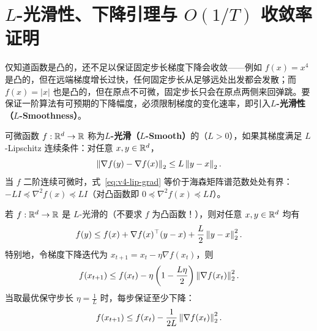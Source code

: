 \section{$L$-光滑性、下降引理与 $O(1/T)$ 收敛率证明}

仅知道函数是凸的，还不足以保证固定步长梯度下降会收敛——例如 $f(x) = x^4$ 是凸的，但在远端梯度增长过快，任何固定步长从足够远处出发都会发散；而 $f(x) = |x|$ 也是凸的，但在原点不可微，固定步长只会在原点两侧来回弹跳。要保证一阶算法有可预期的下降幅度，必须限制梯度的变化速率，即引入\textbf{$L$-光滑性（$L$-Smoothness）}。

\begin{defBox}
\begin{definition}[$L$-光滑函数]\label{def:v4-lsmooth}
可微函数 $f: \mathbb{R}^d \to \mathbb{R}$ 称为\textbf{$L$-光滑（$L$-Smooth）}的（$L > 0$），如果其梯度满足 $L$-Lipschitz 连续条件：对任意 $x, y \in \mathbb{R}^d$，
\begin{equation}\label{eq:v4-lip-grad}
  \left\|\nabla f(y) - \nabla f(x)\right\|_2 \le L \left\|y - x\right\|_2.
\end{equation}
当 $f$ 二阶连续可微时，式~\eqref{eq:v4-lip-grad} 等价于海森矩阵谱范数处处有界：$-LI \preceq \nabla^2 f(x) \preceq LI$（对凸函数即 $0 \preceq \nabla^2 f(x) \preceq LI$）。
\end{definition}
\end{defBox}

\begin{thmBox}
\begin{lemma}\label{lem:v4-descent}
若 $f: \mathbb{R}^d \to \mathbb{R}$ 是 $L$-光滑的（不要求 $f$ 为凸函数！），则对任意 $x, y \in \mathbb{R}^d$ 均有
\begin{equation}\label{eq:v4-descent-ub}
  f(y) \le f(x) + \nabla f(x)^\top (y - x) + \frac{L}{2}\left\|y - x\right\|_2^2.
\end{equation}
特别地，令梯度下降迭代为 $x_{t+1} = x_t - \eta \nabla f(x_t)$，则
\begin{equation}\label{eq:v4-step-drop}
  f(x_{t+1}) \le f(x_t) - \eta\left(1 - \frac{L\eta}{2}\right)\left\|\nabla f(x_t)\right\|_2^2.
\end{equation}
当取最优保守步长 $\eta = \frac{1}{L}$ 时，每步保证至少下降：
\begin{equation}\label{eq:v4-1overL-drop}
  f(x_{t+1}) \le f(x_t) - \frac{1}{2L}\left\|\nabla f(x_t)\right\|_2^2.
\end{equation}
\end{lemma}
\end{thmBox}


